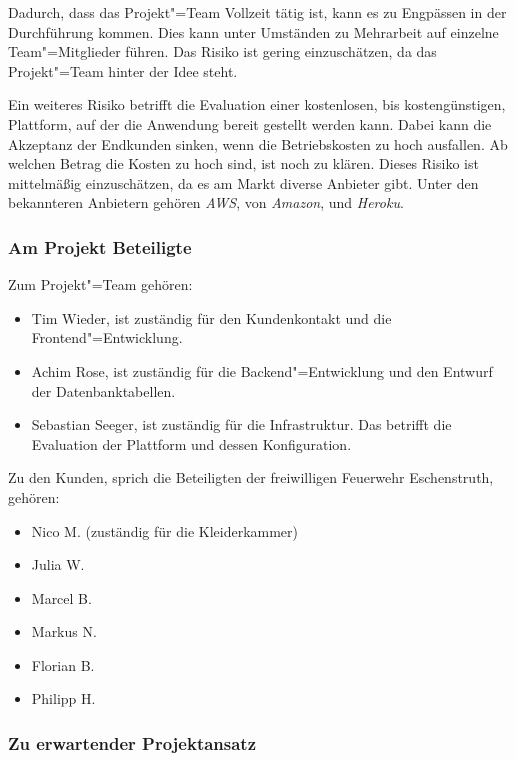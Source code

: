 Dadurch, dass das Projekt"=Team Vollzeit tätig ist, kann es zu Engpässen in der Durchführung kommen. Dies kann unter Umständen zu Mehrarbeit auf einzelne Team"=Mitglieder führen. Das Risiko ist gering einzuschätzen, da das Projekt"=Team  hinter der Idee steht.

Ein weiteres Risiko betrifft die Evaluation einer kostenlosen, bis kostengünstigen, Plattform, auf der die Anwendung bereit gestellt werden kann. Dabei kann die Akzeptanz der Endkunden sinken, wenn die Betriebskosten zu hoch ausfallen. Ab welchen Betrag die Kosten zu hoch sind, ist noch zu klären. Dieses Risiko ist mittelmäßig einzuschätzen, da es am Markt diverse Anbieter gibt. Unter den bekannteren Anbietern gehören \textit{AWS}, von \textit{Amazon}, und \textit{Heroku}.

\subsubsection{Am Projekt Beteiligte}\label{sec:beteiligte}

Zum Projekt"=Team gehören:

\begin{itemize}
\item Tim Wieder, ist zuständig für den Kundenkontakt und die Frontend"=Entwicklung.
\item Achim Rose, ist zuständig für die Backend"=Entwicklung und den Entwurf der Datenbanktabellen. 
\item Sebastian Seeger, ist zuständig für die Infrastruktur. Das betrifft die Evaluation der Plattform und dessen Konfiguration.
\end{itemize}

Zu den Kunden, sprich die Beteiligten der freiwilligen Feuerwehr Eschenstruth, gehören: 

\begin{itemize}
\item Nico M. (zuständig für die Kleiderkammer)
\item Julia W.
\item Marcel B.
\item Markus N.
\item Florian B.
\item Philipp H.
\end{itemize}

\subsubsection{Zu erwartender Projektansatz}

